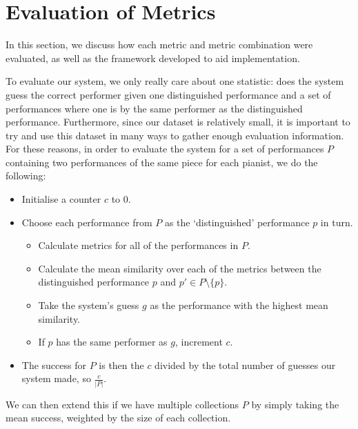 \documentclass[oneside, class=book, 12pt, crop=false]{standalone}
\begin{document}
\section{Evaluation of Metrics}

In this section, we discuss how each metric and metric combination were evaluated, as well as the framework developed to aid implementation.

To evaluate our system, we only really care about one statistic: does the system guess the correct performer given one distinguished performance and a set of performances where one is by the same performer as the distinguished performance. Furthermore, since our dataset is relatively small, it is important to try and use this dataset in many ways to gather enough evaluation information. For these reasons, in order to evaluate the system for a set of performances $P$ containing two performances of the same piece for each pianist, we do the following:

\begin{itemize}
  \item
    Initialise a counter $c$ to 0.

  \item
    Choose each performance from $P$ as the `distinguished' performance $p$ in turn.

    \begin{itemize}
        

      \item
        Calculate metrics for all of the performances in $P$.

      \item
        Calculate the mean similarity over each of the metrics between the distinguished performance $p$ and  $p' \in P \setminus \{p\}$.

      \item
        Take the system's guess $g$ as the performance with the highest mean similarity.
      \item
        If $p$ has the same performer as $g$, increment $c$.
    \end{itemize}

  \item
    The success for $P$ is then the $c$ divided by the total number of guesses our system made, so $\frac{c}{|P|}$.
\end{itemize}

We can then extend this if we have multiple collections $P$ by simply taking the mean success, weighted by the size of each collection.
\end{document}
